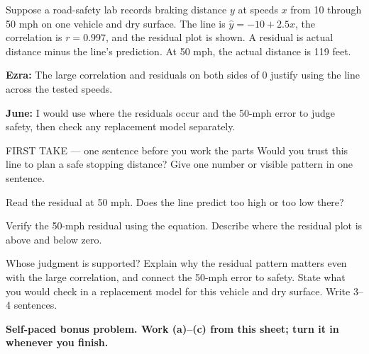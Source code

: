 \documentclass[14pt]{extarticle}
\begin{document}
\pagestyle{empty}


\noindent\begin{minipage}[t]{0.57\linewidth}
\vspace{0pt}
Suppose a road-safety lab records braking distance $y$ at speeds $x$ from 10 through 50 mph on one vehicle and dry surface. The line is $\hat y=-10+2.5x$, the correlation is $r=0.997$, and the residual plot is shown. A residual is actual distance minus the line's prediction. At 50 mph, the actual distance is 119 feet.\par\smallskip \textbf{Ezra:} The large correlation and residuals on both sides of 0 justify using the line across the tested speeds.\par \textbf{June:} I would use where the residuals occur and the 50-mph error to judge safety, then check any replacement model separately.\par
\end{minipage}\hfill
\begin{minipage}[t]{0.40\linewidth}
\vspace{0pt}
\begin{center}
\end{center}
\end{minipage}

\begin{firsttakebox}{FIRST TAKE --- one sentence before you work the parts}
Would you trust this line to plan a safe stopping distance? Give one number or visible pattern in one sentence.
\end{firsttakebox}

\begin{description}[leftmargin=1.15in, labelwidth=1in, itemsep=2pt, topsep=2pt]
  \item[\dokbadge{1}~(a)] Read the residual at 50 mph. Does the line predict too high or too low there?
  \item[\dokbadge{2}~(b)] Verify the 50-mph residual using the equation. Describe where the residual plot is above and below zero.
  \item[\dokbadge{3}~(c)] Whose judgment is supported? Explain why the residual pattern matters even with the large correlation, and connect the 50-mph error to safety. State what you would check in a replacement model for this vehicle and dry surface. Write 3--4 sentences.
\end{description}

\vfill
\textbf{Self-paced bonus problem. Work (a)--(c) from this sheet; turn it in whenever you finish.}
\end{document}
